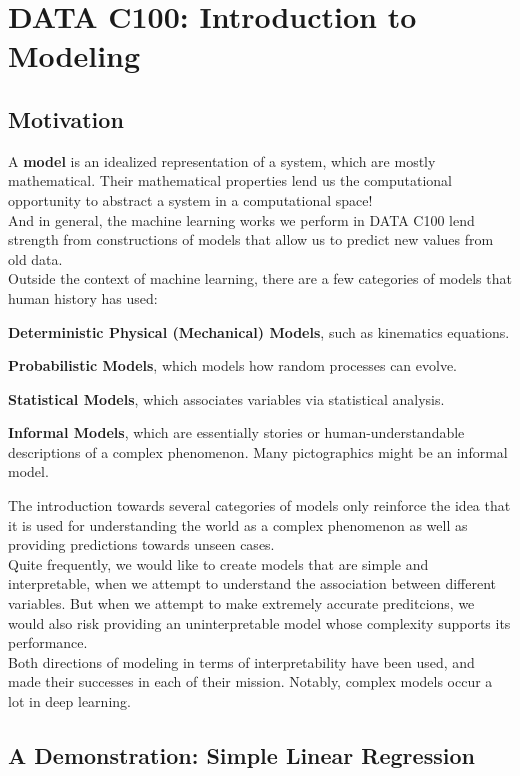 \chapter{DATA C100: Introduction to Modeling}

\section{Motivation}
A \textbf{model} is an idealized representation of a system, which are mostly mathematical. Their mathematical properties lend us the computational opportunity to abstract a system in a computational space! \\
And in general, the machine learning works we perform in DATA C100 lend strength from constructions of models that allow us to predict new values from old data. \\
Outside the context of machine learning, there are a few categories of models that human history has used:
\begin{bindenum}
    \item \textbf{Deterministic Physical (Mechanical) Models}, such as kinematics equations.
    \item \textbf{Probabilistic Models}, which models how random processes can evolve.
    \item \textbf{Statistical Models}, which associates variables via statistical analysis.
    \item \textbf{Informal Models}, which are essentially stories or human-understandable descriptions of a complex phenomenon. Many pictographics might be an informal model.
\end{bindenum}
The introduction towards several categories of models only reinforce the idea that it is used for understanding the world as a complex phenomenon as well as providing predictions towards unseen cases. \\
Quite frequently, we would like to create models that are simple and interpretable, when we attempt to understand the association between different variables.
But when we attempt to make extremely accurate preditcions, we would also risk providing an uninterpretable model whose complexity supports its performance. \\
Both directions of modeling in terms of interpretability have been used, and made their successes in each of their mission. Notably, complex models occur a lot in deep learning. \\

\section{A Demonstration: Simple Linear Regression}

